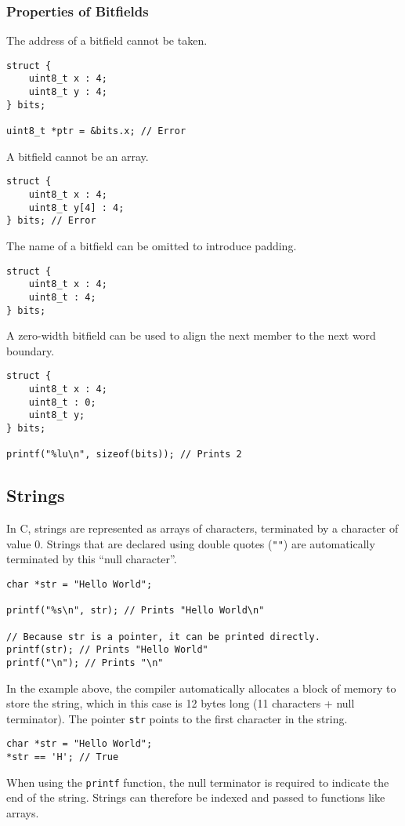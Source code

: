 \documentclass{article}
\begin{document}
\subsubsection{Properties of Bitfields}
The address of a bitfield cannot be taken.
\begin{verbatim}
struct {
    uint8_t x : 4;
    uint8_t y : 4;
} bits;

uint8_t *ptr = &bits.x; // Error
\end{verbatim}
A bitfield cannot be an array.
\begin{verbatim}
struct {
    uint8_t x : 4;
    uint8_t y[4] : 4;
} bits; // Error
\end{verbatim}
The name of a bitfield can be omitted to introduce padding.
\begin{verbatim}
struct {
    uint8_t x : 4;
    uint8_t : 4;
} bits;
\end{verbatim}
A zero-width bitfield can be used to align the next member to the next
word boundary.
\begin{verbatim}
struct {
    uint8_t x : 4;
    uint8_t : 0;
    uint8_t y;
} bits;

printf("%lu\n", sizeof(bits)); // Prints 2
\end{verbatim}
\subsection{Strings}
In C, strings are represented as arrays of characters, terminated by a
character of value 0. Strings that are declared using double quotes
(\texttt{""}) are automatically terminated by this ``null
character''.
\begin{verbatim}
char *str = "Hello World";

printf("%s\n", str); // Prints "Hello World\n"

// Because str is a pointer, it can be printed directly.
printf(str); // Prints "Hello World"
printf("\n"); // Prints "\n"
\end{verbatim}
In the example above, the compiler automatically allocates a block of
memory to store the string, which in this case is 12 bytes long (11
characters + null terminator). The pointer \texttt{str} points to
the first character in the string.
\begin{verbatim}
char *str = "Hello World";
*str == 'H'; // True
\end{verbatim}
When using the \texttt{printf} function, the null terminator is
required to indicate the end of the string. Strings can therefore be
indexed and passed to functions like arrays.
\end{document}
